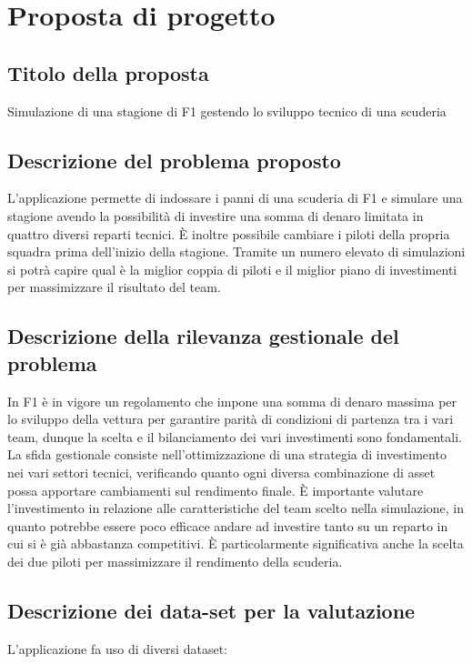\chapter{Proposta di progetto}

\label{Capitolo1}

\section{Titolo della proposta}
Simulazione di una stagione di F1 gestendo lo sviluppo tecnico di una scuderia

\section{Descrizione del problema proposto}
L’applicazione permette di indossare i panni di una scuderia di F1 e simulare una stagione avendo la possibilità di investire una somma di denaro limitata in quattro diversi reparti tecnici. È inoltre possibile cambiare i piloti della propria squadra prima dell’inizio della stagione. Tramite un numero elevato di simulazioni si potrà capire qual è la miglior coppia di piloti e il miglior piano di investimenti per massimizzare il risultato del team.

\section{Descrizione della rilevanza gestionale del problema}
In F1 è in vigore un regolamento che impone una somma di denaro massima per lo sviluppo della vettura per garantire parità di condizioni di partenza tra i vari team, dunque la scelta e il bilanciamento dei vari investimenti sono fondamentali.
La sfida gestionale consiste nell’ottimizzazione di una strategia di investimento nei vari settori tecnici, verificando quanto ogni diversa combinazione di asset possa apportare cambiamenti sul rendimento finale.
È importante valutare l’investimento in relazione alle caratteristiche del team scelto nella simulazione, in quanto potrebbe essere poco efficace andare ad investire tanto su un reparto in cui si è già abbastanza competitivi.
È particolarmente significativa anche la scelta dei due piloti per massimizzare il rendimento della scuderia.

\section{Descrizione dei data-set per la valutazione}
L’applicazione fa uso di diversi dataset:

